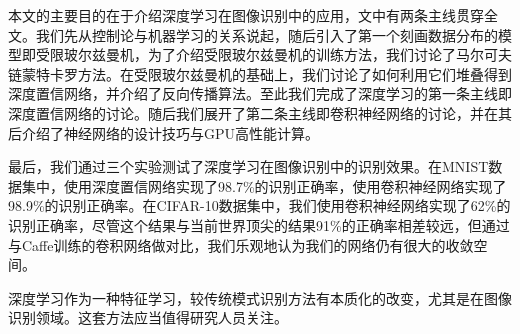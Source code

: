 本文的主要目的在于介绍深度学习在图像识别中的应用，文中有两条主线贯穿全文。我们先从控制论与机器学习的关系说起，随后引入了第一个刻画数据分布的模型即受限玻尔兹曼机，为了介绍受限玻尔兹曼机的训练方法，我们讨论了马尔可夫链蒙特卡罗方法。在受限玻尔兹曼机的基础上，我们讨论了如何利用它们堆叠得到深度置信网络，并介绍了反向传播算法。至此我们完成了深度学习的第一条主线即深度置信网络的讨论。随后我们展开了第二条主线即卷积神经网络的讨论，并在其后介绍了神经网络的设计技巧与GPU高性能计算。

最后，我们通过三个实验测试了深度学习在图像识别中的识别效果。在MNIST数据集中，使用深度置信网络实现了98.7\%的识别正确率，使用卷积神经网络实现了98.9\%的识别正确率。在CIFAR-10数据集中，我们使用卷积神经网络实现了62\%的识别正确率，尽管这个结果与当前世界顶尖的结果91\%的正确率相差较远，但通过与Caffe训练的卷积网络做对比，我们乐观地认为我们的网络仍有很大的收敛空间。

深度学习作为一种特征学习，较传统模式识别方法有本质化的改变，尤其是在图像识别领域。这套方法应当值得研究人员关注。